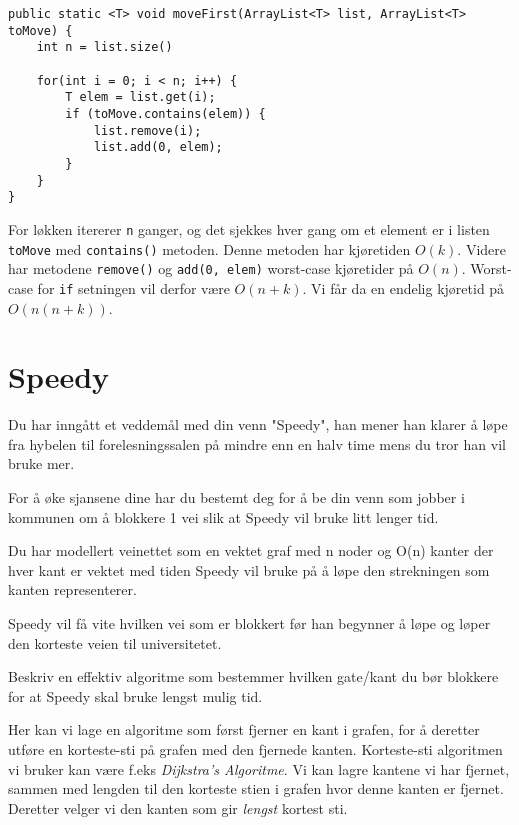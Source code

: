 \documentclass{article}
\begin{document}
\begin{lstlisting}
public static <T> void moveFirst(ArrayList<T> list, ArrayList<T> toMove) {
    int n = list.size()

    for(int i = 0; i < n; i++) {
        T elem = list.get(i);
        if (toMove.contains(elem)) {
            list.remove(i);
            list.add(0, elem);
        }
    }
} 
\end{lstlisting}

\begin{ans}
    For løkken itererer \texttt{n} ganger, og det sjekkes hver gang om et element er i listen \texttt{toMove} med \texttt{contains()} metoden. Denne metoden har kjøretiden \( O(k) \). Videre har metodene \texttt{remove()} og \texttt{add(0, elem)} worst-case kjøretider på \( O(n) \). Worst-case for \texttt{if} setningen vil derfor være \( O\left( n + k \right) \). Vi får da en endelig kjøretid på \( O\left( n\left( n + k \right) \right) \).
\end{ans}

\section{Speedy}
Du har inngått et veddemål med din venn "Speedy", han mener han klarer å løpe fra hybelen til forelesningssalen på mindre enn en halv time mens du tror han vil bruke mer.
\medskip

For å øke sjansene dine har du bestemt deg for å be din venn som jobber i kommunen om å blokkere 1 vei slik at Speedy vil bruke litt lenger tid.
\medskip

Du har modellert veinettet som en vektet graf med n noder og O(n) kanter der hver kant er vektet med tiden Speedy vil bruke på å løpe den strekningen som kanten representerer.
\medskip

Speedy vil få vite hvilken vei som er blokkert før han begynner å løpe og løper den korteste veien til universitetet.
\medskip

Beskriv en effektiv algoritme som bestemmer hvilken gate/kant du bør blokkere for at Speedy skal bruke lengst mulig tid.

\begin{ans}
    Her kan vi lage en algoritme som først fjerner en kant i grafen, for å deretter utføre en korteste-sti på grafen med den fjernede kanten. Korteste-sti algoritmen vi bruker kan være f.eks \textit{Dijkstra's Algoritme}. Vi kan lagre kantene vi har fjernet, sammen med lengden til den korteste stien i grafen hvor denne kanten er fjernet. Deretter velger vi den kanten som gir \textit{lengst} kortest sti.
\end{ans}
\end{document}
